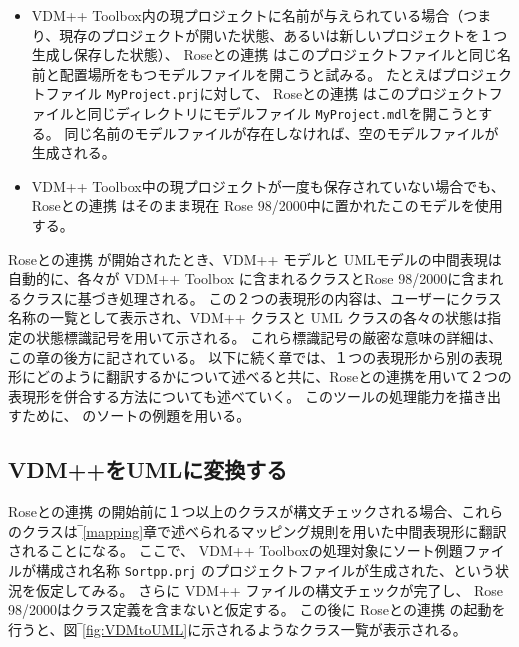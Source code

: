 \documentclass[\pformat,12pt]{jarticle}
\newcommand{\vdmpp}{VDM++}
\newcommand{\ToolboxName}{\vdmpp{} Toolbox}
\newcommand{\link}{Roseとの連携}
\newcommand{\rose}{Rose 98/2000}
\begin{document}
\begin{itemize}
\item \ToolboxName{}内の現プロジェクトに名前が与えられている場合（つまり、現存のプロジェクトが開いた状態、あるいは新しいプロジェクトを１つ生成し保存した状態）、 \link{} はこのプロジェクトファイルと同じ名前と配置場所をもつモデルファイルを開こうと試みる。
たとえばプロジェクトファイル {\tt MyProject.prj}に対して、 \link{} はこのプロジェクトファイルと同じディレクトリにモデルファイル  {\tt MyProject.mdl}を開こうとする。
 同じ名前のモデルファイルが存在しなければ、空のモデルファイルが生成される。
\item \ToolboxName{}中の現プロジェクトが一度も保存されていない場合でも、 \link{} はそのまま現在 \rose{}中に置かれたこのモデルを使用する。
\end{itemize}
 \link{} が開始されたとき、\vdmpp{} モデルと UMLモデルの中間表現は自動的に、各々が \vdmpp{} Toolbox に含まれるクラスと\rose{}に含まれるクラスに基づき処理される。
この２つの表現形の内容は、ユーザーにクラス名称の一覧として表示され、\vdmpp{} クラスと UML クラスの各々の状態は指定の状態標識記号を用いて示される。
これら標識記号の厳密な意味の詳細は、この章の後方に記されている。
以下に続く章では、１つの表現形から別の表現形にどのように翻訳するかについて述べると共に、\link{}を用いて２つの表現形を併合する方法についても述べていく。
このツールの処理能力を描き出すために、 \cite{UserManPP-CSK}のソートの例題を用いる。

\subsection{VDM++をUMLに変換する} \label{trans1}

 \link{} の開始前に１つ以上のクラスが構文チェックされる場合、これらのクラスは‾\ref{mapping}章で述べられるマッピング規則を用いた中間表現形に翻訳されることになる。
ここで、 \vdmpp{} Toolboxの処理対象にソート例題ファイルが構成され名称 {\tt Sortpp.prj} のプロジェクトファイルが生成された、という状況を仮定してみる。
さらに \vdmpp{} ファイルの構文チェックが完了し、 \rose{}はクラス定義を含まないと仮定する。
この後に \link{} の起動を行うと、図‾\ref{fig:VDMtoUML}に示されるようなクラス一覧が表示される。
\end{document}
